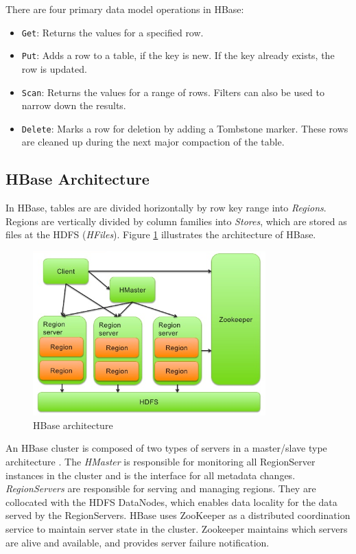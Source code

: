 There are four primary data model operations in HBase:
\begin{itemize}
\item \texttt{Get}: Returns the values for a specified row.
\item \texttt{Put}: Adds a row to a table, if the key is new. If the key already exists, the row is updated.
\item \texttt{Scan}: Returns the values for a range of rows. Filters can also be used to narrow down the results.
\item \texttt{Delete}: Marks a row for deletion by adding a Tombstone marker. These rows are cleaned up during the next major compaction of the table.
\end{itemize}

\subsection{HBase Architecture}

In HBase, tables are are divided horizontally by row key range into \emph{Regions}. Regions are vertically divided by column families into \emph{Stores}, which are stored as files at the HDFS (\emph{HFiles}). Figure \ref{figure:hbase_architecture} illustrates the architecture of HBase.

\begin{figure}[H]
\centering
\includegraphics[width=0.8\textwidth]{figures/hbase_architecture}
\caption{HBase architecture}
\label{figure:hbase_architecture}
\end{figure}

An HBase cluster is composed of two types of servers in a master/slave type architecture \cite{mapr_hbase_architecture}. The \emph{HMaster} is responsible for monitoring all RegionServer instances in the cluster and is the interface for all metadata changes. \emph{RegionServers} are responsible for serving and managing regions. They are collocated with the HDFS DataNodes, which enables data locality for the data served by the RegionServers. HBase uses ZooKeeper as a distributed coordination service to maintain server state in the cluster. Zookeeper maintains which servers are alive and available, and provides server failure notification.

